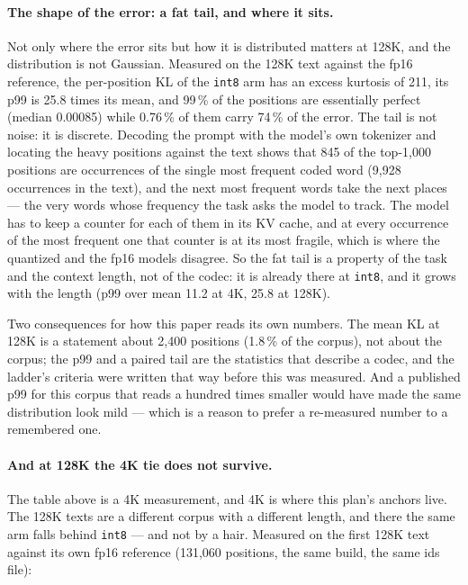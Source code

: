 \documentclass[10pt,twocolumn]{article}
\begin{document}
\paragraph{The shape of the error: a fat tail, and where it sits.} Not only where the error sits but how it is distributed matters at 128K, and the distribution is not Gaussian. Measured on the 128K text against the fp16 reference, the per-position KL of the \texttt{int8} arm has an excess kurtosis of 211, its p99 is 25.8 times its mean, and 99\,\% of the positions are essentially perfect (median 0.00085) while 0.76\,\% of them carry 74\,\% of the error. The tail is not noise: it is discrete. Decoding the prompt with the model's own tokenizer and locating the heavy positions against the text shows that 845 of the top-1,000 positions are occurrences of the single most frequent coded word (9,928 occurrences in the text), and the next most frequent words take the next places --- the very words whose frequency the task asks the model to track. The model has to keep a counter for each of them in its KV cache, and at every occurrence of the most frequent one that counter is at its most fragile, which is where the quantized and the fp16 models disagree. So the fat tail is a property of the task and the context length, not of the codec: it is already there at \texttt{int8}, and it grows with the length (p99 over mean 11.2 at 4K, 25.8 at 128K).

Two consequences for how this paper reads its own numbers. The mean KL at 128K is a statement about 2,400 positions (1.8\,\% of the corpus), not about the corpus; the p99 and a paired tail are the statistics that describe a codec, and the ladder's criteria were written that way before this was measured. And a published p99 for this corpus that reads a hundred times smaller would have made the same distribution look mild --- which is a reason to prefer a re-measured number to a remembered one.

\paragraph{And at 128K the 4K tie does not survive.} The table above is a 4K measurement, and 4K is where this plan's anchors live. The 128K texts are a different corpus with a different length, and there the same arm falls behind \texttt{int8} --- and not by a hair. Measured on the first 128K text against its own fp16 reference (131,060 positions, the same build, the same ids file):
\end{document}
